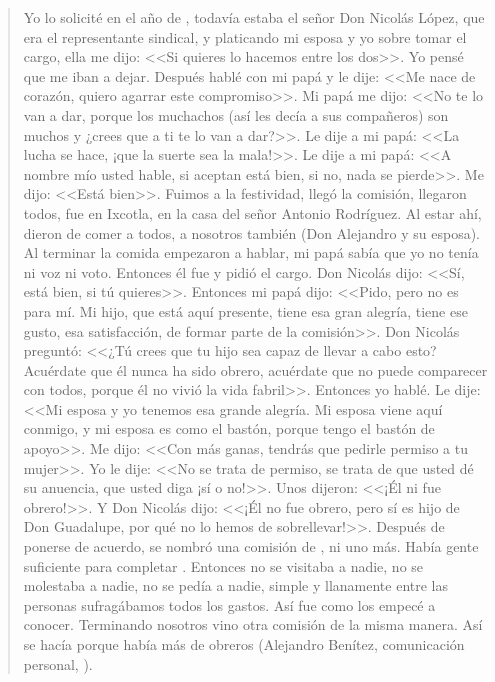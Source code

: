 \documentclass[14pt,letterpaper,twoside]{extbook} %
\begin{document}
\begin{quotation}
\noindent Yo lo solicité en el año de , todavía estaba el señor Don Nicolás López, que era el representante sindical, y platicando mi esposa y yo sobre tomar el cargo, ella me dijo: <<Si quieres lo hacemos entre los dos>>. Yo pensé que me iban a dejar. Después hablé con mi papá y le dije: <<Me nace de corazón, quiero agarrar este compromiso>>. Mi papá me dijo: <<No te lo van a dar, porque los muchachos (así les decía a sus compañeros) son muchos y ¿crees que a ti te lo van a dar?>>. Le dije a mi papá: <<La lucha se hace, ¡que la suerte sea la mala!>>. Le dije a mi papá: <<A nombre mío usted hable, si aceptan está bien, si no, nada se pierde>>. Me dijo: <<Está bien>>. Fuimos a la festividad, llegó la comisión, llegaron todos, fue en Ixcotla, en la casa del señor Antonio Rodríguez. Al estar ahí, dieron de comer a todos, a nosotros también (Don Alejandro y su esposa). Al terminar la comida empezaron a hablar, mi papá sabía que yo no tenía ni voz ni voto. Entonces él fue y pidió el cargo. Don Nicolás dijo: <<Sí, está bien, si tú quieres>>. Entonces mi papá dijo: <<Pido, pero no es para mí. Mi hijo, que está aquí presente, tiene esa gran alegría, tiene ese gusto, esa satisfacción, de formar parte de la comisión>>. Don Nicolás preguntó: <<¿Tú crees que tu hijo sea capaz de llevar a cabo esto? Acuérdate que él nunca ha sido obrero, acuérdate que no puede comparecer con todos, porque él no vivió la vida fabril>>. Entonces yo hablé. Le dije: <<Mi esposa y yo tenemos esa grande alegría. Mi esposa viene aquí
conmigo, y mi esposa es como el bastón, porque tengo el bastón de apoyo>>. Me dijo: <<Con más ganas, tendrás que pedirle permiso a tu mujer>>. Yo le dije: <<No se trata de permiso, se trata de que usted dé su anuencia, que usted diga ¡sí o no!>>. Unos dijeron: <<¡Él ni fue obrero!>>. Y Don Nicolás dijo: <<¡Él no fue obrero, pero sí es hijo de Don Guadalupe, por qué no lo hemos de sobrellevar!>>. Después de ponerse de acuerdo, se nombró una comisión de , ni uno más. Había gente suficiente para completar . Entonces no se visitaba a nadie, no se molestaba a nadie, no se pedía a nadie, simple y llanamente entre las  personas sufragábamos todos los gastos. Así fue como los empecé a conocer. Terminando nosotros vino otra comisión de la misma manera. Así se hacía porque había más de  obreros (Alejandro Benítez, comunicación personal, ).
\end{quotation}
\end{document}

